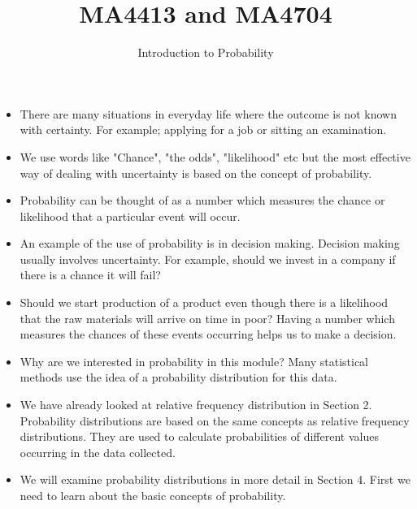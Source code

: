 \documentclass[12pt]{report}
\title{MA4413 and MA4704}
\author{Introduction to Probability}
\begin{document}
\LARGE


{ \Large
	\begin{itemize}
		\item	There are many situations in everyday life where the outcome is not known with certainty. For example; applying for a job or sitting an examination.
		
		\item We use words like "Chance", "the odds", "likelihood" etc but the most effective way of dealing with uncertainty is based on the concept of probability.
		
		\item Probability can be thought of as a number which measures the chance or likelihood that a particular event will occur.
		
	\end{itemize}	
	
	
}
{ \Large
	\begin{itemize}
		\item	An example of the use of probability is in decision making. Decision making usually involves uncertainty. For example, should we invest in a company if there is a chance it will fail? 
		
		\item	Should we start production of a product even though there is a likelihood that the raw materials will arrive on time in poor? Having a number which measures the chances of these events occurring helps us to make a decision.
		
		\item 	Why are we interested in probability in this module? Many statistical methods use the idea of a probability distribution for this data.
	\end{itemize}
	
	
	
}
{ \Large
	\begin{itemize}	
		\item	We have already looked at relative frequency distribution in Section 2. Probability distributions are based on the same concepts as relative frequency distributions. They are used to calculate probabilities of different values occurring in the data collected.
		
		\item	We will examine probability distributions in more detail in Section 4. First we need to learn about the basic concepts of probability.
	\end{itemize}
	
}
\end{document}
